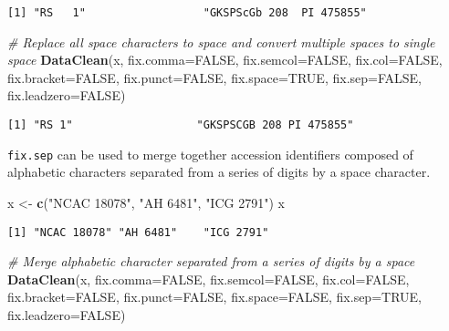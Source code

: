 \documentclass[]{article}
\newenvironment{Shaded}{\begin{snugshade}}{\end{snugshade}}
\newcommand{\CommentTok}[1]{\textcolor[rgb]{0.56,0.35,0.01}{\textit{#1}}}
\newcommand{\DataTypeTok}[1]{\textcolor[rgb]{0.13,0.29,0.53}{#1}}
\newcommand{\KeywordTok}[1]{\textcolor[rgb]{0.13,0.29,0.53}{\textbf{#1}}}
\newcommand{\NormalTok}[1]{#1}
\newcommand{\OtherTok}[1]{\textcolor[rgb]{0.56,0.35,0.01}{#1}}
\newcommand{\StringTok}[1]{\textcolor[rgb]{0.31,0.60,0.02}{#1}}
\begin{document}
\begin{verbatim}
[1] "RS   1"                  "GKSPScGb 208  PI 475855"
\end{verbatim}

\begin{Shaded}
\begin{Highlighting}[]
\CommentTok{# Replace all space characters to space and convert multiple spaces to single space}
\KeywordTok{DataClean}\NormalTok{(x, }\DataTypeTok{fix.comma=}\OtherTok{FALSE}\NormalTok{, }\DataTypeTok{fix.semcol=}\OtherTok{FALSE}\NormalTok{, }\DataTypeTok{fix.col=}\OtherTok{FALSE}\NormalTok{,}
          \DataTypeTok{fix.bracket=}\OtherTok{FALSE}\NormalTok{, }\DataTypeTok{fix.punct=}\OtherTok{FALSE}\NormalTok{,}
          \DataTypeTok{fix.space=}\OtherTok{TRUE}\NormalTok{,}
          \DataTypeTok{fix.sep=}\OtherTok{FALSE}\NormalTok{, }\DataTypeTok{fix.leadzero=}\OtherTok{FALSE}\NormalTok{)}
\end{Highlighting}
\end{Shaded}

\begin{verbatim}
[1] "RS 1"                   "GKSPSCGB 208 PI 475855"
\end{verbatim}

\texttt{fix.sep} can be used to merge together accession identifiers
composed of alphabetic characters separated from a series of digits by a
space character.

\begin{Shaded}
\begin{Highlighting}[]
\NormalTok{x <-}\StringTok{ }\KeywordTok{c}\NormalTok{(}\StringTok{"NCAC 18078"}\NormalTok{, }\StringTok{"AH 6481"}\NormalTok{, }\StringTok{"ICG 2791"}\NormalTok{)}
\NormalTok{x}
\end{Highlighting}
\end{Shaded}

\begin{verbatim}
[1] "NCAC 18078" "AH 6481"    "ICG 2791"  
\end{verbatim}

\begin{Shaded}
\begin{Highlighting}[]
\CommentTok{# Merge alphabetic character separated from a series of digits by a space}
\KeywordTok{DataClean}\NormalTok{(x, }\DataTypeTok{fix.comma=}\OtherTok{FALSE}\NormalTok{, }\DataTypeTok{fix.semcol=}\OtherTok{FALSE}\NormalTok{, }\DataTypeTok{fix.col=}\OtherTok{FALSE}\NormalTok{,}
          \DataTypeTok{fix.bracket=}\OtherTok{FALSE}\NormalTok{, }\DataTypeTok{fix.punct=}\OtherTok{FALSE}\NormalTok{, }\DataTypeTok{fix.space=}\OtherTok{FALSE}\NormalTok{,}
          \DataTypeTok{fix.sep=}\OtherTok{TRUE}\NormalTok{,}
          \DataTypeTok{fix.leadzero=}\OtherTok{FALSE}\NormalTok{)}
\end{Highlighting}
\end{Shaded}
\end{document}
